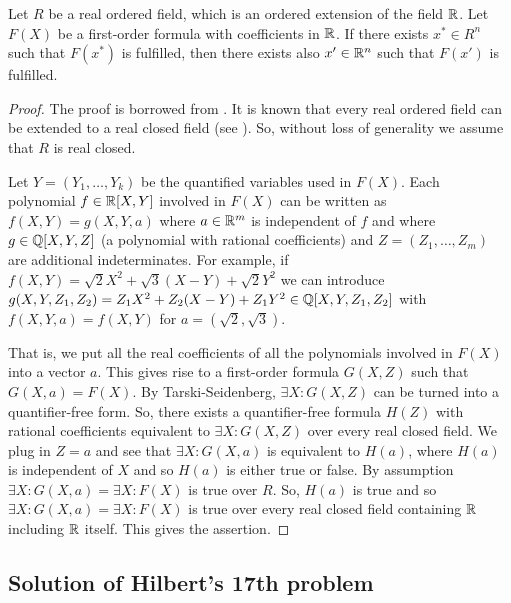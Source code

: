 \begin{corollary}  
	\label{cor:tarski}
	Let $R$ be a real ordered field, which is an ordered extension of the field $\mathbb{R}$. Let $F(X)$ be a first-order formula with coefficients in $\mathbb{R}$. If there exists $x^\ast \in R^n$ such that $F(x^\ast)$ is fulfilled, then there exists also $x' \in \mathbb{R}^n$ such that $F(x')$ is fulfilled. 
\end{corollary}
\begin{proof}
	The proof is borrowed from \cite[Cor.~1.4.7]{Bochnak:Coste:Roy:1998}. It is known that every real ordered field can be extended to a real closed field (see \cite{Bochnak:Coste:Roy:1998}). So, without loss of generality we assume that $R$ is real closed. 
	
	Let $Y=(Y_1,\ldots,Y_k)$ be the quantified variables used in $F(X)$. 
	Each polynomial $f \in \mathbb{R}[X,Y]$ involved in $F(X)$ can be written as $f(X,Y) = g(X,Y,a)$ where $a \in \mathbb{R}^m$ is independent of $f$ and where $g \in \mathbb{Q}[X,Y,Z]$ (a polynomial with rational coefficients) and $Z=(Z_1,\ldots,Z_m)$ are additional indeterminates. For example, if $f(X,Y) = \sqrt{2} X^2 + \sqrt{3} (X-Y) + \sqrt{2} Y^2$ we can introduce $g(X,Y,Z_1,Z_2) = Z_1 X^2 + Z_2 (X-Y) + Z_1 Y^2 \in \mathbb{Q}[X,Y,Z_1,Z_2]$ with $f(X,Y,a) = f(X,Y)$ for $a=(\sqrt{2},\sqrt{3})$.
	
	That is, we put all the real coefficients of all the polynomials involved in $F(X)$ into a vector $a$. This gives rise to a first-order formula $G(X,Z)$ such that $G(X,a) = F(X)$. By Tarski-Seidenberg, $\exists X : G(X,Z)$ can be turned into a quantifier-free form. So, there exists a quantifier-free formula $H(Z)$ with rational coefficients equivalent to $\exists X : G(X,Z)$ over every real closed field. We plug in $Z=a$ and see that $\exists X : G(X,a)$ is equivalent to $H(a)$, where $H(a)$ is independent of $X$ and so $H(a)$ is either true or false. By assumption $\exists X : G(X,a) = \exists X : F(X)$ is true over $R$. So, $H(a)$ is true and so $\exists X : G(X,a) = \exists X : F(X)$ is true over every real closed field containing $\mathbb{R}$ including $\mathbb{R}$ itself. This gives the assertion. 
\end{proof}

\subsection{Solution of Hilbert's 17th problem}


